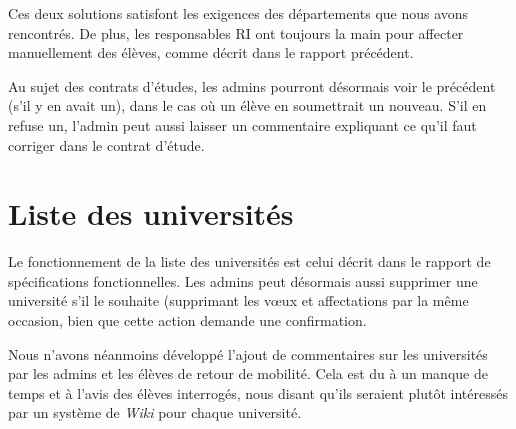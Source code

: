 Ces deux solutions satisfont les exigences des départements que nous avons rencontrés. De plus, les responsables RI ont toujours la main pour affecter manuellement des élèves, comme décrit dans le rapport précédent.

Au sujet des contrats d'études, les admins pourront désormais voir le précédent (s'il y en avait un), dans le cas où un élève en soumettrait un nouveau. S'il en refuse un, l'admin peut aussi laisser un commentaire expliquant ce qu'il faut corriger dans le contrat d'étude.

\section{Liste des universités}
Le fonctionnement de la liste des universités est celui décrit dans le rapport de spécifications fonctionnelles. Les admins peut désormais aussi supprimer une université s'il le souhaite (supprimant les vœux et affectations par la même occasion, bien que cette action demande une confirmation.

Nous n'avons néanmoins développé l'ajout de commentaires sur les universités par les admins et les élèves de retour de mobilité. Cela est du à un manque de temps et à l'avis des élèves interrogés, nous disant qu'ils seraient plutôt intéressés par un système de \textit{Wiki} pour chaque université.